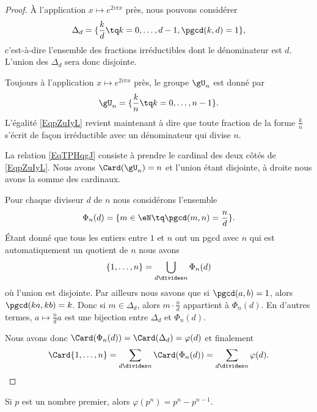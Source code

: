 \begin{proof}
    À l'application \( x\mapsto  e^{2i\pi x}\) près, nous pouvons considérer
    \begin{equation}
        \Delta_d=\{ \frac{ k }{ d }\tq k=0,\ldots, d-1, \pgcd(k,d)=1 \},
    \end{equation}
    c'est-à-dire l'ensemble des fractions irréductibles dont le dénominateur est \( d\). L'union des \( \Delta_d\) sera donc disjointe.

    Toujours à l'application \( x\mapsto  e^{2i\pi x}\) près, le groupe \( \gU_n\) est donné par
    \begin{equation}
        \gU_n=\{ \frac{ k }{ n }\tq k=0,\ldots, n-1 \}.
    \end{equation}
    L'égalité \eqref{EqpZuIyL} revient maintenant à dire que toute fraction de la forme \( \frac{ k }{ n }\) s'écrit de façon irréductible avec un dénominateur qui divise \( n\).

    La relation \eqref{EqTPHqgJ} consiste à prendre le cardinal des deux côtés de \eqref{EqpZuIyL}. Nous avons \( \Card(\gU_n)=n\) et l'union étant disjointe, à droite nous avons la somme des cardinaux.


    Pour chaque diviseur \( d\) de \( n\) nous considérons l'ensemble
    \begin{equation}
        \Phi_n(d)=\{ m\in \eN\tq \pgcd(m,n)=\frac{ n }{ d } \}.
    \end{equation}
    Étant donné que tous les entiers entre \( 1\) et \( n\) ont un pgcd avec \( n\) qui est automatiquement un quotient de \( n\) nous avons
    \begin{equation}
        \{ 1,\ldots, n \}=\bigcup_{d\divides n}\Phi_n(d)
    \end{equation}
    où l'union est disjointe. Par ailleurs nous savons que si \( \pgcd(a,b)=1\), alors \( \pgcd(ka,kb)=k\). Donc si \( m\in \Delta_d\), alors \( m\cdot \frac{ n }{ d }\) appartient à \( \Phi_n(d)\). En d'autres termes, \( a\mapsto \frac{ n }{ d }a\) est une bijection entre \( \Delta_d\) et \( \Phi_n(d)\).

    Nous avons donc \( \Card(\Phi_n(d))=\Card(\Delta_d)=\varphi(d)\) et finalement
    \begin{equation}
        \Card\{ 1,\ldots, n \}=\sum_{d\divides n}\Card(\Phi_n(d))=\sum_{d\divides n}\varphi(d).
    \end{equation}
\end{proof}

\begin{lemma}
    Si \( p\) est un nombre premier, alors \( \varphi(p^n)=p^n-p^{n-1}\).
\end{lemma}

